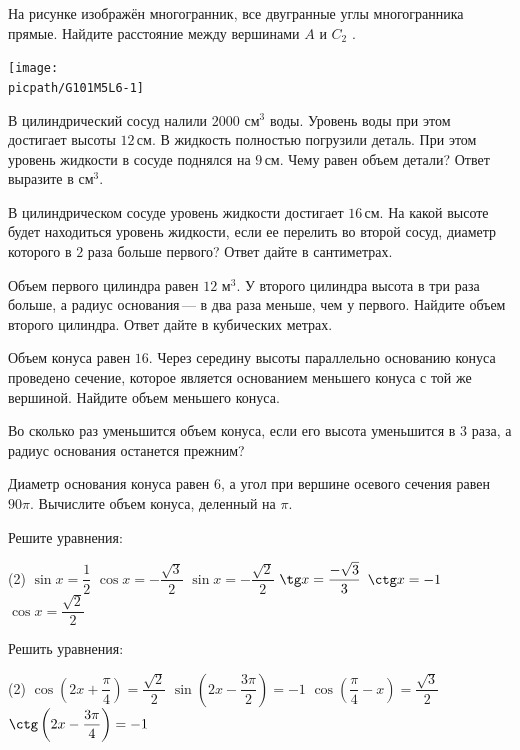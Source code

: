 \begin{class}[number=2]
\begin{listofex}
\begin{minipage}[t]{\bodywidth}
			На рисунке изображён многогранник, все двугранные углы многогранника прямые. Найдите расстояние между вершинами \(A\) и \(C_2\) .
		\end{minipage}
		\hspace{0.02\linewidth}
		\begin{minipage}[t]{\picwidth}
			\texttt{[image: \\picpath/G101M5L6-1]}
		\end{minipage}
			\item В цилиндрический сосуд налили \(2000\) см\(^3\) воды. Уровень воды при этом достигает высоты \(12\) см. В жидкость полностью погрузили деталь. При этом уровень жидкости в сосуде поднялся на \(9\) см. Чему равен объем детали? Ответ выразите в см\(^3\).
		\item В цилиндрическом сосуде уровень жидкости достигает \(16\) см. На какой высоте будет находиться уровень жидкости, если ее перелить во второй сосуд, диаметр которого в \(2\) раза больше первого? Ответ дайте в сантиметрах.
		\item Объем первого цилиндра равен \(12\) м\(^3\). У второго цилиндра высота в три раза больше, а радиус основания --- в два раза меньше, чем у первого. Найдите объем второго цилиндра. Ответ дайте в кубических метрах.
		\item Объем конуса равен \(16\). Через середину высоты параллельно основанию конуса проведено сечение, которое является основанием меньшего конуса с той же вершиной. Найдите объем меньшего конуса.
		\item Во сколько раз уменьшится объем конуса, если его высота уменьшится в \(3\) раза, а радиус основания останется прежним?
		\item Диаметр основания конуса равен \(6\), а угол при вершине осевого сечения равен \(90\pi \). Вычислите объем конуса, деленный на \( \pi \).
		\item Решите уравнения:
		\begin{tasks}(2)
			\task \( \sin x=\dfrac{1}{2} \)
			\task \( \cos x=-\dfrac{\sqrt{3}}{2} \)
			\task \( \sin x = -\dfrac{\sqrt{2}}{2} \)
			\task \( \tg x = \dfrac{-\sqrt{3}}{3} \)
			\task \( \ctg x = -1 \)
			\task \( \cos x = \dfrac{\sqrt{2}}{2} \)
		\end{tasks}
		\item Решить уравнения:
		\begin{tasks}(2)
			\task \( \cos\left( 2x+\dfrac{\pi}{4} \right)=\dfrac{\sqrt{2}}{2} \)
			\task \( \sin \left( 2x-\dfrac{3\pi}{2} \right) = -1 \)
			\task \( \cos \left( \dfrac{\pi}{4}-x \right)=\dfrac{\sqrt{3}}{2} \)
			\task \( \ctg\left( 2x-\dfrac{3\pi}{4} \right)=-1 \)
		\end{tasks}
	\end{listofex}
\end{class}

